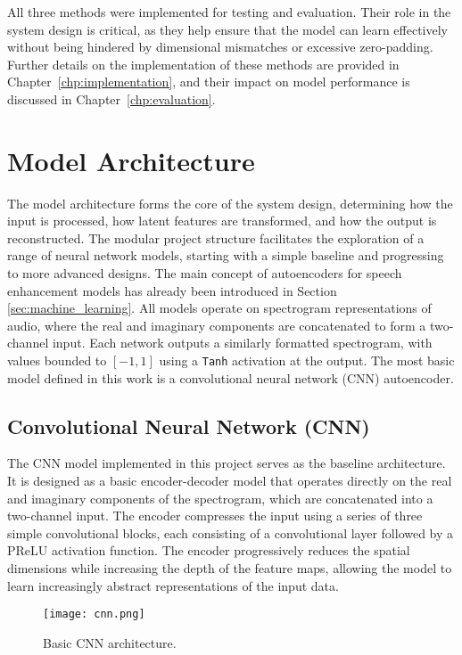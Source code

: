 All three methods were implemented for testing and evaluation. Their role in the system design is critical, as they help ensure that the model can learn effectively without being hindered by dimensional mismatches or excessive zero-padding. Further details on the implementation of these methods are provided in Chapter~\ref{chp:implementation}, and their impact on model performance is discussed in Chapter~\ref{chp:evaluation}.

\section{Model Architecture}
\label{sec:model_architecture}

The model architecture forms the core of the system design, determining how the input is processed, how latent features are transformed, and how the output is reconstructed. The modular project structure facilitates the exploration of a range of neural network models, starting with a simple baseline and progressing to more advanced designs. The main concept of autoencoders for speech enhancement models has already been introduced in Section \ref{sec:machine_learning}. All models operate on spectrogram representations of audio, where the real and imaginary components are concatenated to form a two-channel input. Each network outputs a similarly formatted spectrogram, with values bounded to \([-1, 1]\) using a \texttt{Tanh} activation at the output. The most basic model defined in this work is a convolutional neural network (CNN) autoencoder.

\subsection{Convolutional Neural Network (CNN)}
\label{sec:cnn}

The CNN model implemented in this project serves as the baseline architecture. It is designed as a basic encoder-decoder model that operates directly on the real and imaginary components of the spectrogram, which are concatenated into a two-channel input. The encoder compresses the input using a series of three simple convolutional blocks, each consisting of a convolutional layer followed by a PReLU activation function. The encoder progressively reduces the spatial dimensions while increasing the depth of the feature maps, allowing the model to learn increasingly abstract representations of the input data.

\begin{figure}[h]
    \centering
    \texttt{[image: cnn.png]}
    \caption{\label{fig:cnn}Basic CNN architecture.}
\end{figure}

